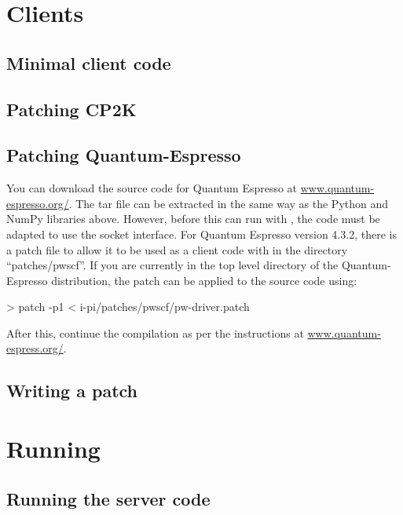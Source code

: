 \documentclass[11pt,english,fleqn]{report}
\newenvironment{code}{%
\footnotesize 
\verbatim
}{
\endverbatim
\normalsize
}
\begin{document}
\section{Clients}




\subsection{Minimal client code}


\subsection{Patching CP2K}



\subsection{Patching Quantum-Espresso}

You can download the source code for Quantum Espresso at \url{www.quantum-espresso.org/}.
The tar file can be extracted in the same way as the Python and NumPy
libraries above. However, before this can run with \ipi, the code
must be adapted to use the socket interface. For Quantum Espresso
version 4.3.2, there is a patch file to allow it to be used as a client
code with \ipi in the directory {}``patches/pwscf''. If you are
currently in the top level directory of the Quantum-Espresso distribution,
the patch can be applied to the source code using:

\begin{code}
> patch -p1 < i-pi/patches/pwscf/pw-driver.patch
\end{code}

After this, continue the compilation as per the instructions at \url{www.quantum-espress.org/}.


\subsection{Writing a patch}



\section{Running \ipi}


\subsection{Running the server code}
\end{document}
